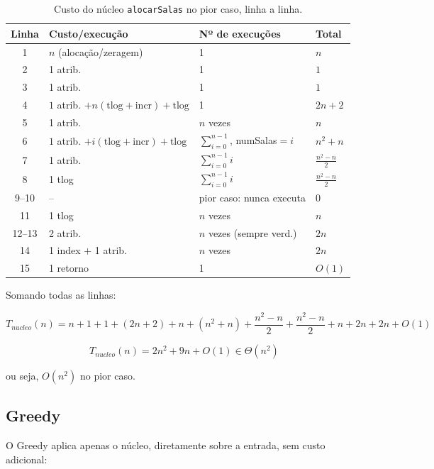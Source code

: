 \documentclass[12pt]{article}
\begin{document}
\begin{table}[ht]
\centering
\footnotesize
\caption{Custo do núcleo \texttt{alocarSalas} no pior caso, linha a linha.}
\label{tab:custo-nucleo}
\begin{tabular}{c|l|l|l}
\hline
\textbf{Linha} & \textbf{Custo/execução} & \textbf{Nº de execuções} & \textbf{Total} \\
\hline
1  & $n$ (alocação/zeragem) & 1 & $n$ \\
2  & 1 atrib. & 1 & $1$ \\
3  & 1 atrib. & 1 & $1$ \\
4  & $1$ atrib. $+ n(\text{tlog}+\text{incr}) + \text{tlog}$ & 1 & $2n+2$ \\
5  & 1 atrib. & $n$ vezes & $n$ \\
6  & $1$ atrib. $+ i(\text{tlog}+\text{incr}) + \text{tlog}$ & $\sum_{i=0}^{n-1}$, numSalas$=i$ & $n^2+n$ \\
7  & 1 atrib. & $\sum_{i=0}^{n-1} i$ & $\frac{n^2-n}{2}$ \\
8  & 1 tlog & $\sum_{i=0}^{n-1} i$ & $\frac{n^2-n}{2}$ \\
9--10 & -- & pior caso: nunca executa & $0$ \\
11 & 1 tlog & $n$ vezes & $n$ \\
12--13 & 2 atrib. & $n$ vezes (sempre verd.) & $2n$ \\
14 & 1 index $+$ 1 atrib. & $n$ vezes & $2n$ \\
15 & 1 retorno & 1 & $O(1)$ \\
\hline
\end{tabular}
\end{table}

Somando todas as linhas:

\begin{equation}
T_{nucleo}(n) = n + 1 + 1 + (2n+2) + n + (n^2+n) + \frac{n^2-n}{2} + \frac{n^2-n}{2} + n + 2n + 2n + O(1)
\end{equation}

\begin{equation}
T_{nucleo}(n) = 2n^2 + 9n + O(1) \in \Theta(n^2)
\end{equation}

ou seja, $O(n^2)$ no pior caso.

\subsection{Greedy}

O Greedy aplica apenas o núcleo, diretamente sobre a entrada, sem custo
adicional:
\end{document}
